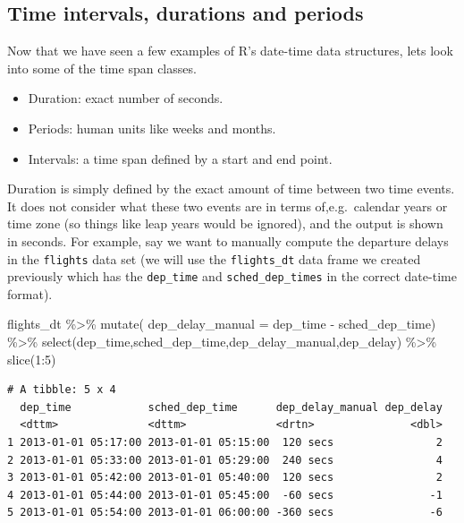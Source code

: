 \documentclass[
  letterpaper,
  DIV=11,
  numbers=noendperiod]{scrartcl}
\newenvironment{Shaded}{\begin{snugshade}}{\end{snugshade}}
\newcommand{\AttributeTok}[1]{\textcolor[rgb]{0.40,0.45,0.13}{#1}}
\newcommand{\DecValTok}[1]{\textcolor[rgb]{0.68,0.00,0.00}{#1}}
\newcommand{\FunctionTok}[1]{\textcolor[rgb]{0.28,0.35,0.67}{#1}}
\newcommand{\NormalTok}[1]{\textcolor[rgb]{0.00,0.23,0.31}{#1}}
\newcommand{\SpecialCharTok}[1]{\textcolor[rgb]{0.37,0.37,0.37}{#1}}
\providecommand{\tightlist}{%
  \setlength{\itemsep}{0pt}\setlength{\parskip}{0pt}}\usepackage{longtable,booktabs,array}
\begin{document}
\subsection{Time intervals, durations and
periods}\label{time-intervals-durations-and-periods}

Now that we have seen a few examples of R's date-time data structures,
lets look into some of the time span classes.

\begin{itemize}
\tightlist
\item
  Duration: exact number of seconds.
\item
  Periods: human units like weeks and months.
\item
  Intervals: a time span defined by a start and end point.
\end{itemize}

Duration is simply defined by the exact amount of time between two time
events. It does not consider what these two events are in terms
of,e.g.~calendar years or time zone (so things like leap years would be
ignored), and the output is shown in seconds. For example, say we want
to manually compute the departure delays in the \texttt{flights} data
set (we will use the \texttt{flights\_dt} data frame we created
previously which has the \texttt{dep\_time} and
\texttt{sched\_dep\_times} in the correct date-time format).

\begin{Shaded}
\begin{Highlighting}[]
\NormalTok{ flights\_dt }\SpecialCharTok{\%\textgreater{}\%}
  \FunctionTok{mutate}\NormalTok{(}
    \AttributeTok{dep\_delay\_manual =}\NormalTok{  dep\_time }\SpecialCharTok{{-}}\NormalTok{ sched\_dep\_time) }\SpecialCharTok{\%\textgreater{}\%}
    \FunctionTok{select}\NormalTok{(dep\_time,sched\_dep\_time,dep\_delay\_manual,dep\_delay)  }\SpecialCharTok{\%\textgreater{}\%}
  \FunctionTok{slice}\NormalTok{(}\DecValTok{1}\SpecialCharTok{:}\DecValTok{5}\NormalTok{)}
\end{Highlighting}
\end{Shaded}

\begin{verbatim}
# A tibble: 5 x 4
  dep_time            sched_dep_time      dep_delay_manual dep_delay
  <dttm>              <dttm>              <drtn>               <dbl>
1 2013-01-01 05:17:00 2013-01-01 05:15:00  120 secs                2
2 2013-01-01 05:33:00 2013-01-01 05:29:00  240 secs                4
3 2013-01-01 05:42:00 2013-01-01 05:40:00  120 secs                2
4 2013-01-01 05:44:00 2013-01-01 05:45:00  -60 secs               -1
5 2013-01-01 05:54:00 2013-01-01 06:00:00 -360 secs               -6
\end{verbatim}
\end{document}
